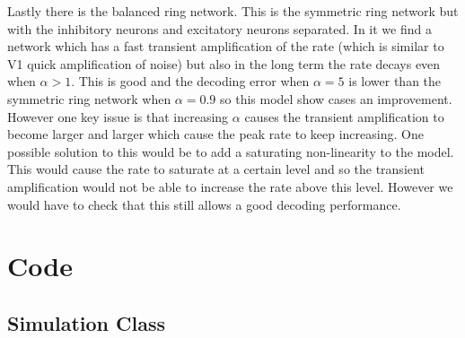 \documentclass[a4paper, 11pt, oneside]{report}
\begin{document}
Lastly there is the balanced ring network. This is the symmetric ring network but with the inhibitory neurons and excitatory neurons separated.
In it we find a network which has a fast transient amplification of the rate (which is similar to V1 quick amplification of noise)
but also in the long term the rate decays even when $\alpha>1$.
This is good and the decoding error when $\alpha = 5$ is lower than the symmetric ring network when $\alpha=0.9$ so 
this model show cases an improvement.
However one key issue is that increasing $\alpha$ causes the transient amplification to become larger and larger
which cause the peak rate to keep increasing. One possible solution to this would be to add a saturating non-linearity to the model.
This would cause the rate to saturate at a certain level and so the transient amplification would not be able to increase the rate above this level.
However we would have to check that this still allows a good decoding performance.

\section*{Code}

\subsection*{Simulation Class}
\end{document}

